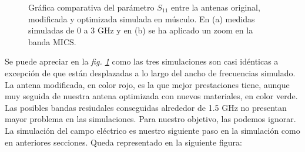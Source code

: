 \begin{figure}[!htb]
    \centering
    \caption{Gráfica comparativa del parámetro $S_{11}$ entre la antenas original, modificada y optimizada simulada en músculo. En (a) medidas simuladas de 0 a 3 GHz y en (b) se ha aplicado un zoom en la banda MICS.}
    \label{fig:fig5.38}
\end{figure}

Se puede apreciar en la \textit{fig. \ref{fig:fig5.38}} como las tres simulaciones son casi idénticas a excepción de que están desplazadas a lo largo del ancho de frecuencias simulado. La antena modificada, en color rojo, es la que mejor prestaciones tiene, aunque muy seguida de nuestra antena optimizada con nuevos materiales, en color verde. Las posibles bandas resiudales conseguidas alrededor de 1.5 GHz no presentan mayor problema en las simulaciones. Para nuestro objetivo, las podemos ignorar.\\

La simulación del campo eléctrico es nuestro siguiente paso en la simulación como en anteriores secciones. Queda representado en la siguiente figura:

